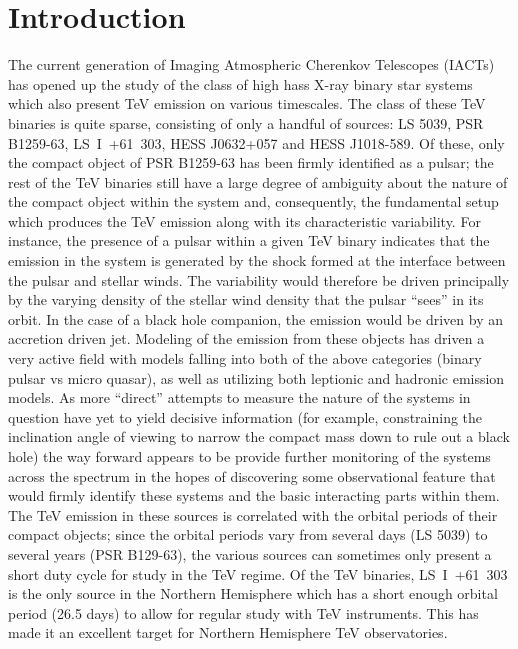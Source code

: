 \documentclass[preprint2]{aastex}
\newcommand{\lsi}{LS~I~+61~303}
\begin{document}
\keywords{}

\section{Introduction}

The current generation of Imaging Atmospheric Cherenkov Telescopes (IACTs) has opened up the study of the class of high hass X-ray binary star systems which also present TeV emission on various timescales. The class of these TeV binaries is quite sparse, consisting of only a handful of sources: LS 5039, PSR B1259-63, \lsi{}, HESS J0632+057 and HESS J1018-589. Of these, only the compact object of PSR B1259-63 has been firmly identified as a pulsar; the rest of the TeV binaries still have a large degree of ambiguity about the nature of the compact object within the system and, consequently, the fundamental setup which produces the TeV emission along with its characteristic variability. For instance, the presence of a pulsar within a given TeV binary indicates that the emission in the system is generated by the shock formed at the interface between the pulsar and stellar winds. The variability would therefore be driven principally by the varying density of the stellar wind density that the pulsar ``sees'' in its orbit. In the case of a black hole companion, the emission would be driven by an accretion driven jet. Modeling of the emission from these objects has driven a very active field with models falling into both of the above categories (binary pulsar vs micro quasar), as well as utilizing both leptionic and hadronic emission models. As more ``direct'' attempts to measure the nature of the systems in question have yet to yield decisive information (for example, constraining the inclination angle of viewing to narrow the compact mass down to rule out a black hole) the way forward appears to be provide further monitoring of the systems across the spectrum in the hopes of discovering some observational feature that would firmly identify these systems and the basic interacting parts within them. The TeV emission in these sources is correlated with the orbital periods of their compact objects; since the orbital periods vary from several days (LS 5039) to several years (PSR B129-63), the various sources can sometimes only present a short duty cycle for study in the TeV regime. Of the TeV binaries, \lsi{} is the only source in the Northern Hemisphere which has a short enough orbital period (26.5 days) to allow for regular study with TeV instruments. This has made it an excellent target for Northern Hemisphere TeV observatories. 
\end{document}
